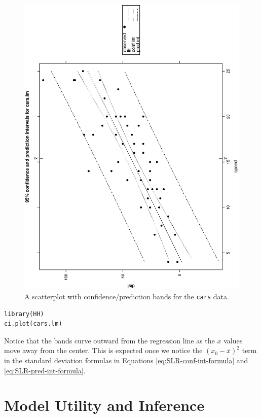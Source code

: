 \documentclass[captions=tableheading]{scrbook}
\begin{document}
\begin{figure}[th]
  \includegraphics[angle=270, totalheight=4in]{img/carscipi.ps}
  \caption[Scatterplot with confidence/prediction bands for the \texttt{cars} data]{\small A scatterplot with confidence/prediction bands for the \texttt{cars} data.}
  \label{fig:Scatter-cars-CIPI}
\end{figure}


\begin{verbatim}
library(HH)
ci.plot(cars.lm)
\end{verbatim}

Notice that the bands curve outward from the regression line as the \(x\) values move away from the center. This is expected once we notice the \((x_{0}-\overline{x})^{2}\) term in the standard deviation formulas in Equations \ref{eq:SLR-conf-int-formula} and \ref{eq:SLR-pred-int-formula}.
\section{Model Utility and Inference}
\label{sec-11-3}
\end{document}
